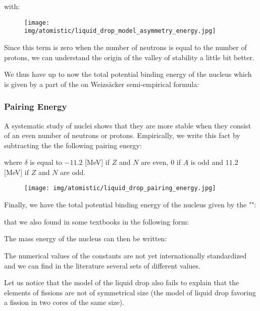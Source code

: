 	with:
	
	\begin{figure}[H]
		\centering
		\texttt{[image: img/atomistic/liquid\_drop\_model\_asymmetry\_energy.jpg]}
	\end{figure}
	Since this term is zero when the number of neutrons is equal to the number of protons, we can understand the origin of the valley of stability a little bit better.
	
	We thus have up to now the total potential binding energy of the nucleus which is given by a part of the on Weizsäcker semi-empirical formula:
	
	
	\subsubsection{Pairing Energy}
	A systematic study of nuclei shows that they are more stable when they consist of an even number of neutrons or protons. Empirically, we write this fact by subtracting the the following pairing energy:
	
	where $\delta$ is equal to $-11.2$ [MeV] if $Z$ and $N$ are even, $0$ if $A$ is odd and $11.2$ [MeV] if $Z$ and $N$ are odd.
	\begin{figure}[H]
		\centering
		\texttt{[image: img/atomistic/liquid\_drop\_pairing\_energy.jpg]}
	\end{figure}
	Finally, we have the total potential binding energy of the nucleus given by the "":
	
	that we also found in some textbooks in the following form:
	
	The mass energy of the nucleus can then be written:
	
	\begin{tcolorbox}[title=Remark,colframe=black,arc=10pt]
	The numerical values of the constants are not yet internationally standardized and we can find in the literature several sets of different values.
	\end{tcolorbox}
	Let us notice that the model of the liquid drop also fails to explain that the elements of fissions are not of symmetrical size (the model of liquid drop favoring a fission in two cores of the same size).

